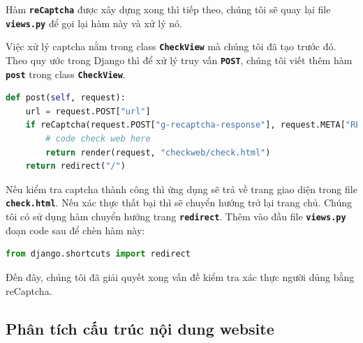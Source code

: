 \par
Hàm \textbf{\texttt{reCaptcha}} được xây dựng xong thì tiếp theo, chúng tôi sẽ quay lại file \textbf{\texttt{views.py}} để gọi lại hàm này và xử lý nó.
\par
Việc xử lý captcha nằm trong class \textbf{\texttt{CheckView}} mà chúng tôi đã tạo trước đó. Theo quy ước trong Django thì để xử lý truy vấn \textbf{\texttt{POST}}, chúng tôi viết thêm hàm \textbf{\texttt{post}} trong class \textbf{\texttt{CheckView}}.
\begin{lstlisting}[language=Python]
def post(self, request):
    url = request.POST["url"]
    if reCaptcha(request.POST["g-recaptcha-response"], request.META["REMOTE_ADDR"]):
        # code check web here
        return render(request, "checkweb/check.html")
    return redirect("/")
\end{lstlisting}
\par
Nếu kiểm tra captcha thành công thì ứng dụng sẽ trả về trang giao diện trong file \textbf{\texttt{check.html}}. Nếu xác thực thất bại thì sẽ chuyển hướng trở lại trang chủ. Chúng tôi có sử dụng hàm chuyển hướng trang \textbf{\texttt{redirect}}. Thêm vào đầu file \textbf{\texttt{views.py}} đoạn code sau để chèn hàm này:
\begin{lstlisting}[language=Python]
from django.shortcuts import redirect
\end{lstlisting}
\par
Đến đây, chúng tôi đã giải quyết xong vấn đề kiểm tra xác thực người dủng bằng reCaptcha.
\subsection{Phân tích cấu trúc nội dung website}

